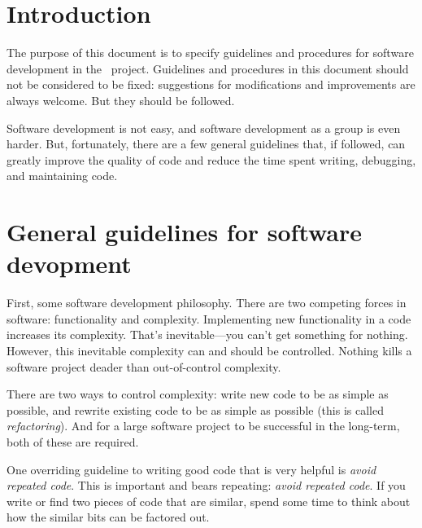 \documentclass{article}
\begin{document}

\tableofcontents

\section{Introduction} \label{s:intro}

The purpose of this document is to specify guidelines and procedures
for software development in the \cello\ project.  Guidelines and
procedures in this document should not be considered to be fixed:
suggestions for modifications and improvements are always welcome.
But they should be followed.

Software development is not easy, and software development as a group
is even harder.  But, fortunately, there are a few general guidelines
that, if followed, can greatly improve the quality of code and reduce
the time spent writing, debugging, and maintaining code.

\section{General guidelines for software devopment}

First, some software development philosophy.  There are two competing
forces in software: functionality and complexity.  Implementing new
functionality in a code increases its complexity.  That's
inevitable---you can't get something for nothing.  However, this
inevitable complexity can and should be controlled.  Nothing kills a
software project deader than out-of-control complexity.

There are two ways to control complexity: write new code to be as
simple as possible, and rewrite existing code to be as simple as
possible (this is called \textit{refactoring}).  And for a large
software project to be successful in the long-term, both of these are
required.

One overriding guideline to writing good code that is very helpful is
\textit{avoid repeated code}.  This is important and bears repeating:
\textit{avoid repeated code}.  If you write or find two pieces of
code that are similar, spend some time to think about how the similar
bits can be factored out.  
\end{document}
